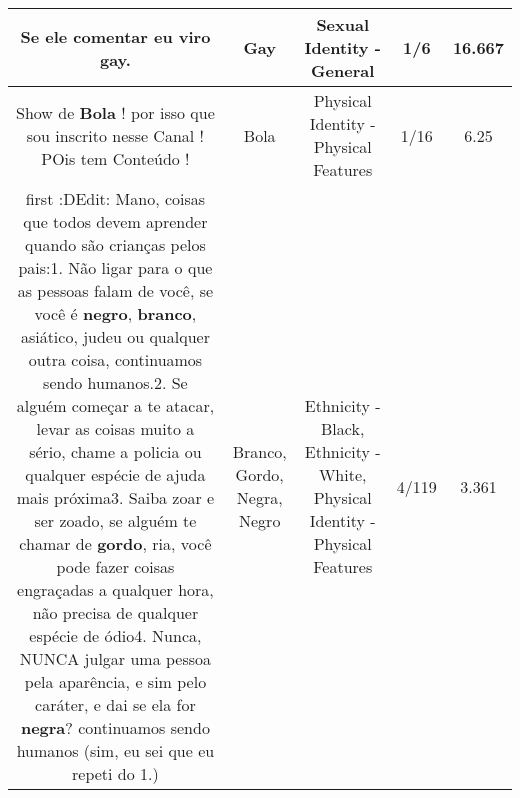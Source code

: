 \documentclass[11pt]{article}
\newlength\mylength
\begin{document}
\begin{center}
\begin{longtable}{|C{.65\mylength}|C{.30\mylength}|C{.12\mylength}|C{.12\mylength}|C{.12\mylength}|}
  \small Se ele comentar eu viro \textbf{gay}.\normalsize   & Gay & Sexual Identity - General & 1/6 & 16.667 \\  \hline
  \small Show de \textbf{Bola} ! por isso que sou inscrito nesse Canal ! POis tem Conteúdo !\normalsize   & Bola & Physical Identity - Physical Features & 1/16 & 6.25 \\  \hline
  \small first :DEdit: Mano, coisas que todos devem aprender quando são crianças pelos pais:1. Não ligar para o que as pessoas falam de você, se você é \textbf{negro}, \textbf{branco}, asiático, judeu ou qualquer outra coisa, continuamos sendo humanos.2. Se alguém começar a te atacar, levar as coisas muito a sério, chame a policia ou qualquer espécie de ajuda mais próxima3. Saiba zoar e ser zoado, se alguém te chamar de \textbf{gordo}, ria, você pode fazer coisas engraçadas a qualquer hora, não precisa de qualquer espécie de ódio4. Nunca, NUNCA julgar uma pessoa pela aparência, e sim pelo caráter, e dai se ela for \textbf{negra}? continuamos sendo humanos (sim, eu sei que eu repeti do 1.)\normalsize   & Branco, Gordo, Negra, Negro & Ethnicity - Black, Ethnicity - White, Physical Identity - Physical Features & 4/119 & 3.361 \\  \hline
  
\end{longtable}
\end{center}
\end{document}
